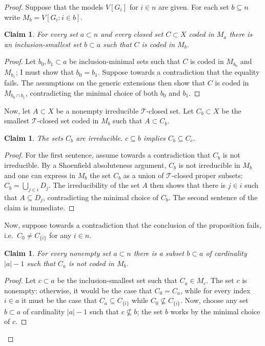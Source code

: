 \documentclass{article}
\newtheorem{claim}[theorem]{Claim}
\theoremstyle{definition}
\begin{document}
\begin{proof}
Suppose that the models $V[G_i]$ for $i\in n$ are given. For each set $b\subseteq n$ write $M_b=V[G_i\colon i\in b]$.

\begin{claim}
For every set $a\subset n$ and every closed set $C\subset X$ coded in $M_a$ there is an inclusion-smallest set $b\subset a$ such that $C$ is coded in $M_b$.
\end{claim}

\begin{proof}
Let $b_0, b_1\subset a$ be inclusion-minimal sets such that $C$ is coded in $M_{b_0}$ and $M_{b_1}$; I must show that $b_0=b_1$. Suppose towards a contradiction that the equality fails. The assumptions on the generic extensions then show that $C$ is coded in $M_{b_0\cap b_1}$, contradicting the minimal choice of both $b_0$ and $b_1$.
\end{proof}

\noindent Now, let $A\subset X$ be a nonempty irreducible $\mathcal{T}$-closed set. Let $C_b\subset X$ be the smallest $\mathcal{T}$-closed set coded in $M_b$ such that $A\subset C_b$. 

\begin{claim}
The sets $C_b$ are irreducible. $c\subseteq b$ implies $C_b\subseteq C_c$.
\end{claim}

\begin{proof}
For the first sentence, assume towards a contradiction that $C_b$ is not irreducible. By a Shoenfield absoluteness argument, $C_b$ is not irreducible in $M_b$ and one can express in $M_b$ the set $C_b$ as a union of $\mathcal{T}$-closed proper subsets: $C_b=\bigcup_{j\in i}D_j$. The irreducibility of the set $A$ then shows that there is $j\in i$ such that $A\subseteq D_j$, contradicting the minimal choice of $C_b$. The second sentence of the claim is immediate. 
\end{proof}

\noindent Now, suppose towards a contradiction that the conclusion of the proposition fails, i.e.\ $C_0\neq C_{\{i\}}$ for any $i\in n$.

\begin{claim}
For every nonempty set $a\subset n$ there is a subset $b\subset a$ of cardinality $|a|-1$ such that $C_a$ is not coded in $M_b$.
\end{claim}

\begin{proof}
Let $c\subset a$ be the inclusion-smallest set such that $C_a\in M_c$. The set $c$ is nonempty: otherwise, it would be the case that $C_0=C_a$, while for every index $i\in a$ it must be the case that $C_a\subseteq C_{\{i\}}$ while $C_0\not\subseteq C_{\{i\}}$. Now, choose any set $b\subset a$ of cardinality $|a|-1$ such that $c\not\subseteq b$; the set $b$ works by the minimal choice of $c$.
\end{proof}


\end{proof}
\end{document}
